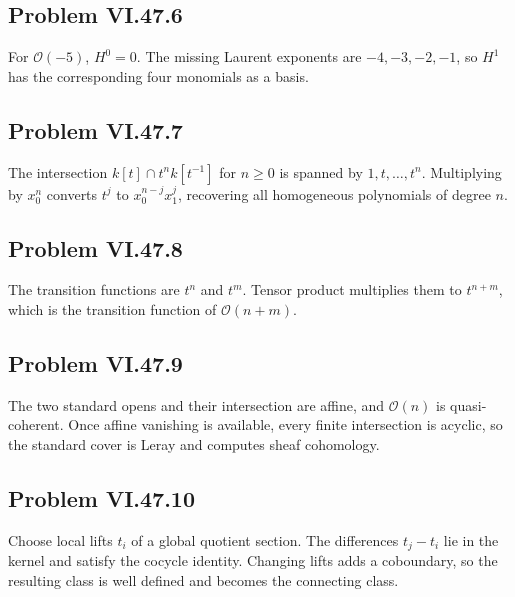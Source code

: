 \subsection*{Problem VI.47.6}
\begin{solution}
For \(\mathcal O(-5)\), \(H^0=0\).  The missing Laurent exponents are \(-4,-3,-2,-1\), so \(H^1\) has the corresponding four monomials as a basis.
\end{solution}

\subsection*{Problem VI.47.7}
\begin{solution}
The intersection \(k[t]\cap t^nk[t^{-1}]\) for \(n\ge0\) is spanned by \(1,t,\dots,t^n\).  Multiplying by \(x_0^n\) converts \(t^j\) to \(x_0^{n-j}x_1^j\), recovering all homogeneous polynomials of degree \(n\).
\end{solution}

\subsection*{Problem VI.47.8}
\begin{solution}
The transition functions are \(t^n\) and \(t^m\).  Tensor product multiplies them to \(t^{n+m}\), which is the transition function of \(\mathcal O(n+m)\).
\end{solution}

\subsection*{Problem VI.47.9}
\begin{solution}
The two standard opens and their intersection are affine, and \(\mathcal O(n)\) is quasi-coherent.  Once affine vanishing is available, every finite intersection is acyclic, so the standard cover is Leray and computes sheaf cohomology.
\end{solution}

\subsection*{Problem VI.47.10}
\begin{solution}
Choose local lifts \(t_i\) of a global quotient section.  The differences \(t_j-t_i\) lie in the kernel and satisfy the cocycle identity.  Changing lifts adds a coboundary, so the resulting class is well defined and becomes the connecting class.
\end{solution}

